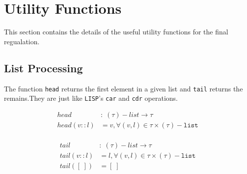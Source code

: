\section{Utility Functions}
This section contains the details of the useful utility functions for the final regualation.

\subsection{List Processing}
The function \texttt{head} returns the first element in a given list and \texttt{tail} returns the remains.They are just like \texttt{LISP}'s \texttt{car} and \texttt{cdr} operations.
\begin{multicols}{2}
\begin{align*}
head &:\; (\tau)-list\rightarrow \tau \\
head(v::l)&=v,\forall (v,l)\in\tau\times(\tau)-\texttt{list}\\
\end{align*}

\begin{align*}
tail  &:\;  (\tau)-list\rightarrow \tau\\
tail(v::l)&  =  l,\forall (v,l)\in \tau\times (\tau)-\texttt{list}\\
tail({[\;]})&  =  {[\;]}\\
\end{align*}
\end{multicols}

